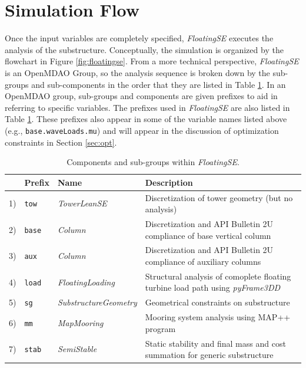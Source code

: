 \section{Simulation Flow}
Once the input variables are completely specified, \textit{FloatingSE}
executes the analysis of the substructure.  Conceptually, the simulation
is organized by the flowchart in Figure \ref{fig:floatingse}.  From a
more technical perspective, \textit{FloatingSE} is an OpenMDAO Group, so
the analysis sequence is broken down by the sub-groups and
sub-components in the order that they are listed in Table
\ref{tbl:exec}.  In an OpenMDAO group, sub-groups and components are
given prefixes to aid in referring to specific variables.  The prefixes
used in \textit{FloatingSE} are also listed in Table \ref{tbl:exec}.
These prefixes also appear in some of the variable names listed above (e.g.,
\texttt{base.waveLoads.mu}) and will appear in the discussion of
optimization constraints in Section \ref{sec:opt}.

\begin{table}[htbp] \begin{center}
    \caption{Components and sub-groups within \textit{FloatingSE}.}
    \label{tbl:exec}
{\small
  \begin{tabular}{ l l l l } \hline
    &  \textbf{Prefix} & \textbf{Name} & \textbf{Description} \\ \hline\hline
    1) & \texttt{tow} & \textit{TowerLeanSE} & Discretization of tower
    geometry (but no analysis) \\
    2) & \texttt{base} & \textit{Column} & Discretization and API
    Bulletin 2U compliance of base vertical column \\
    3) & \texttt{aux} & \textit{Column} & Discretization and API
    Bulletin 2U compliance of auxiliary columns \\
    4) & \texttt{load} & \textit{FloatingLoading} & Structural analysis
    of comoplete floating turbine load path using \textit{pyFrame3DD} \\
    5) & \texttt{sg} & \textit{SubstructureGeometry} & Geometrical constraints
    on substructure \\
    6) & \texttt{mm} & \textit{MapMooring} & Mooring system analysis using MAP++ program \\
    7) & \texttt{stab} & \textit{SemiStable} & Static stability and final mass and cost summation for generic substructure \\
  \hline \end{tabular}
}
\end{center} \end{table}

